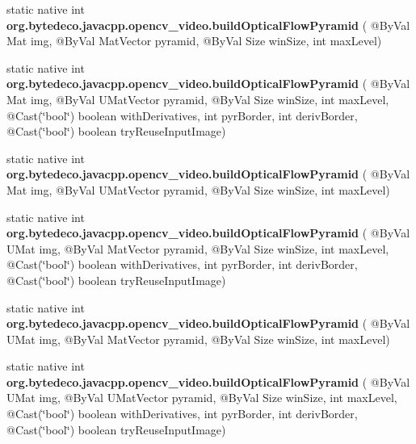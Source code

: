 \begin{DoxyCompactItemize}
\mbox{\label{group__video__track_ga9314ba9858dbe6769c41c00d3ec0eca0}} 
static native int {\bfseries org.\+bytedeco.\+javacpp.\+opencv\+\_\+video.\+build\+Optical\+Flow\+Pyramid} ( @By\+Val Mat img, @By\+Val Mat\+Vector pyramid, @By\+Val Size win\+Size, int max\+Level)
\item 
\mbox{\label{group__video__track_ga3ed760f32861fc26a51af5ee523a8b58}} 
static native int {\bfseries org.\+bytedeco.\+javacpp.\+opencv\+\_\+video.\+build\+Optical\+Flow\+Pyramid} ( @By\+Val Mat img, @By\+Val U\+Mat\+Vector pyramid, @By\+Val Size win\+Size, int max\+Level, @Cast(\char`\"{}bool\char`\"{}) boolean with\+Derivatives, int pyr\+Border, int deriv\+Border, @Cast(\char`\"{}bool\char`\"{}) boolean try\+Reuse\+Input\+Image)
\item 
\mbox{\label{group__video__track_gace2b4fa6ce37f84ebacf9106f32cf1ff}} 
static native int {\bfseries org.\+bytedeco.\+javacpp.\+opencv\+\_\+video.\+build\+Optical\+Flow\+Pyramid} ( @By\+Val Mat img, @By\+Val U\+Mat\+Vector pyramid, @By\+Val Size win\+Size, int max\+Level)
\item 
\mbox{\label{group__video__track_gae92f8b92c413d1dbc8814d61a6db5c9e}} 
static native int {\bfseries org.\+bytedeco.\+javacpp.\+opencv\+\_\+video.\+build\+Optical\+Flow\+Pyramid} ( @By\+Val U\+Mat img, @By\+Val Mat\+Vector pyramid, @By\+Val Size win\+Size, int max\+Level, @Cast(\char`\"{}bool\char`\"{}) boolean with\+Derivatives, int pyr\+Border, int deriv\+Border, @Cast(\char`\"{}bool\char`\"{}) boolean try\+Reuse\+Input\+Image)
\item 
\mbox{\label{group__video__track_ga2b1acb4e49eb8c3dc5359fec6597552b}} 
static native int {\bfseries org.\+bytedeco.\+javacpp.\+opencv\+\_\+video.\+build\+Optical\+Flow\+Pyramid} ( @By\+Val U\+Mat img, @By\+Val Mat\+Vector pyramid, @By\+Val Size win\+Size, int max\+Level)
\item 
\mbox{\label{group__video__track_ga074f5375391e2d4c783cc1e8f9fdedf9}} 
static native int {\bfseries org.\+bytedeco.\+javacpp.\+opencv\+\_\+video.\+build\+Optical\+Flow\+Pyramid} ( @By\+Val U\+Mat img, @By\+Val U\+Mat\+Vector pyramid, @By\+Val Size win\+Size, int max\+Level, @Cast(\char`\"{}bool\char`\"{}) boolean with\+Derivatives, int pyr\+Border, int deriv\+Border, @Cast(\char`\"{}bool\char`\"{}) boolean try\+Reuse\+Input\+Image)

\end{DoxyCompactItemize}
